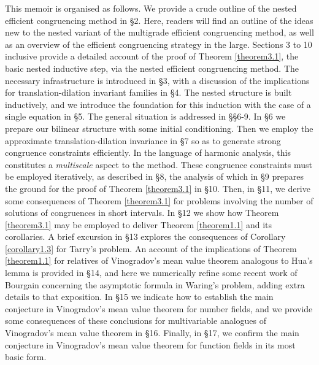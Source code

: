 \documentclass[12pt,reqno]{amsart}
\theoremstyle{definition}
\theoremstyle{remark}
\numberwithin{equation}{section}
\begin{document}
\par This memoir is organised as follows. We provide a crude outline of the nested efficient 
congruencing method in \S2. Here, readers will find an outline of the ideas new to the 
nested variant of the multigrade efficient congruencing method, as well as an overview of 
the efficient congruencing strategy in the large. Sections 3 to 10 inclusive provide a 
detailed account of the proof of Theorem \ref{theorem3.1}, the basic nested inductive 
step, via the nested efficient congruencing method. The necessary infrastructure is 
introduced in \S3, with a discussion of the implications for translation-dilation invariant 
families in \S4. The nested structure is built inductively, and we introduce the foundation 
for this induction with the case of a single equation in \S5. The general situation is 
addressed in \S\S6-9. In \S6 we prepare our bilinear structure with some initial conditioning. 
Then we employ the approximate translation-dilation invariance in \S7 so as to generate 
strong congruence constraints efficiently. In the language of harmonic analysis, this 
constitutes a {\it multiscale} aspect to the method. These congruence constraints must be 
employed iteratively, as described in \S8, the analysis of which in \S9 prepares the ground 
for the proof of Theorem \ref{theorem3.1} in \S10. Then, in \S11, we derive some 
consequences of Theorem \ref{theorem3.1} for problems involving the number of solutions 
of congruences in short intervals. In \S12 we show how Theorem \ref{theorem3.1} may be 
employed to deliver Theorem \ref{theorem1.1} and its corollaries. A brief excursion in \S13 
explores the consequences of Corollary \ref{corollary1.3} for Tarry's problem. An account of 
the implications of Theorem \ref{theorem1.1} for relatives of Vinogradov's mean value 
theorem analogous to Hua's lemma is provided in \S14, and here we numerically refine some 
recent work of Bourgain \cite{Bou2017} concerning the asymptotic formula in Waring's 
problem, adding extra details to that exposition. In \S15 we indicate how to establish the 
main conjecture in Vinogradov's mean value theorem for number fields, and we provide 
some consequences of these conclusions for multivariable analogues of Vinogradov's mean 
value theorem in \S16. Finally, in \S17, we confirm the main conjecture in Vinogradov's mean 
value theorem for function fields in its most basic form.\par
\end{document}
